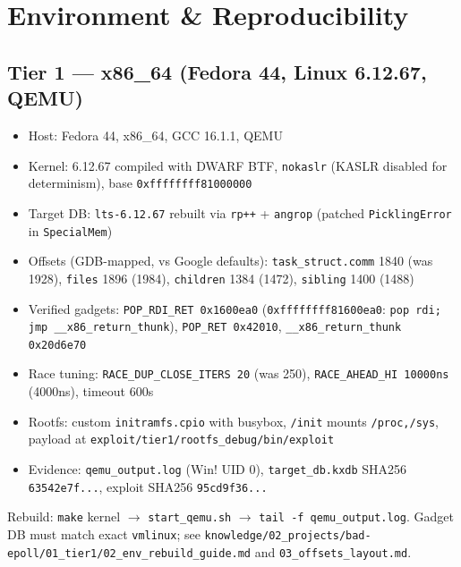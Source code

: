 \documentclass[11pt,a4paper]{article}
\begin{document}
\newpage

\section{Environment \& Reproducibility}
\label{sec:env}

\subsection{Tier 1 — x86\_64 (Fedora 44, Linux 6.12.67, QEMU)}
\begin{itemize}
  \item Host: Fedora 44, x86\_64, GCC 16.1.1, QEMU
  \item Kernel: 6.12.67 compiled with DWARF BTF, \texttt{nokaslr} (KASLR disabled for determinism), base \texttt{0xffffffff81000000}
  \item Target DB: \texttt{lts-6.12.67} rebuilt via \texttt{rp++} + \texttt{angrop} (patched \texttt{PicklingError} in \texttt{SpecialMem})
  \item Offsets (GDB-mapped, vs Google defaults): \texttt{task\_struct.comm} 1840 (was 1928), \texttt{files} 1896 (1984), \texttt{children} 1384 (1472), \texttt{sibling} 1400 (1488)
  \item Verified gadgets: \texttt{POP\_RDI\_RET 0x1600ea0} (\texttt{0xffffffff81600ea0}: \texttt{pop rdi; jmp \_\_x86\_return\_thunk}), \texttt{POP\_RET 0x42010}, \texttt{\_\_x86\_return\_thunk 0x20d6e70}
  \item Race tuning: \texttt{RACE\_DUP\_CLOSE\_ITERS 20} (was 250), \texttt{RACE\_AHEAD\_HI 10000ns} (4000ns), timeout 600s
  \item Rootfs: custom \texttt{initramfs.cpio} with busybox, \texttt{/init} mounts \texttt{/proc,/sys}, payload at \texttt{exploit/tier1/rootfs\_debug/bin/exploit}
  \item Evidence: \texttt{qemu\_output.log} (Win! UID 0), \texttt{target\_db.kxdb} SHA256 \texttt{63542e7f...}, exploit SHA256 \texttt{95cd9f36...}
\end{itemize}
Rebuild: \texttt{make} kernel $\to$ \texttt{start\_qemu.sh} $\to$ \texttt{tail -f qemu\_output.log}. Gadget DB must match exact \texttt{vmlinux}; see \texttt{knowledge/02\_projects/bad-epoll/01\_tier1/02\_env\_rebuild\_guide.md} and \texttt{03\_offsets\_layout.md}.
\end{document}
